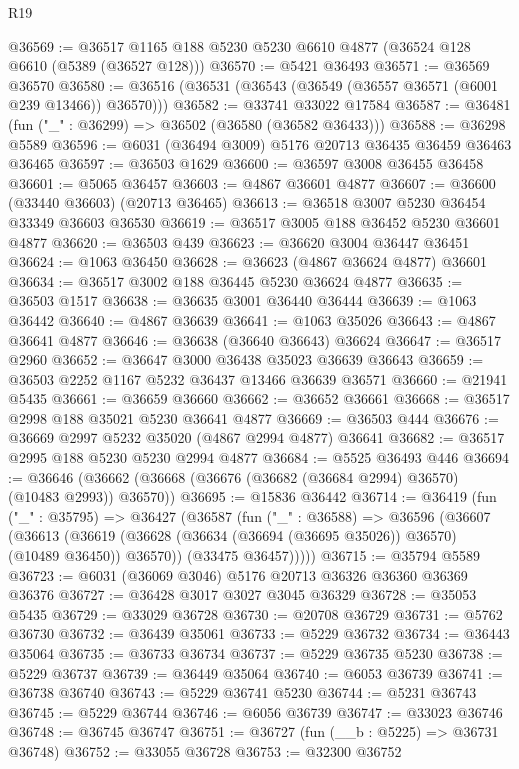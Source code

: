 \begin{lexlean}{R19}
\begin{coremodule}
@36569 := @36517 @1165 @188 @5230 @5230 @6610 @4877 (@36524 @128 @6610 (@5389 (@36527 @128)))
@36570 := @5421 @36493
@36571 := @36569 @36570
@36580 := @36516 (@36531 (@36543 (@36549 (@36557 @36571 (@6001 @239 @13466)) @36570)))
@36582 := @33741 @33022 @17584
@36587 := @36481 (fun ("_" : @36299) => @36502 (@36580 (@36582 @36433)))
@36588 := @36298 @5589
@36596 := @6031 (@36494 @3009) @5176 @20713 @36435 @36459 @36463 @36465
@36597 := @36503 @1629
@36600 := @36597 @3008 @36455 @36458
@36601 := @5065 @36457
@36603 := @4867 @36601 @4877
@36607 := @36600 (@33440 @36603) (@20713 @36465)
@36613 := @36518 @3007 @5230 @36454 @33349 @36603 @36530
@36619 := @36517 @3005 @188 @36452 @5230 @36601 @4877
@36620 := @36503 @439
@36623 := @36620 @3004 @36447 @36451
@36624 := @1063 @36450
@36628 := @36623 (@4867 @36624 @4877) @36601
@36634 := @36517 @3002 @188 @36445 @5230 @36624 @4877
@36635 := @36503 @1517
@36638 := @36635 @3001 @36440 @36444
@36639 := @1063 @36442
@36640 := @4867 @36639
@36641 := @1063 @35026
@36643 := @4867 @36641 @4877
@36646 := @36638 (@36640 @36643) @36624
@36647 := @36517 @2960
@36652 := @36647 @3000 @36438 @35023 @36639 @36643
@36659 := @36503 @2252 @1167 @5232 @36437 @13466 @36639 @36571
@36660 := @21941 @5435
@36661 := @36659 @36660
@36662 := @36652 @36661
@36668 := @36517 @2998 @188 @35021 @5230 @36641 @4877
@36669 := @36503 @444
@36676 := @36669 @2997 @5232 @35020 (@4867 @2994 @4877) @36641
@36682 := @36517 @2995 @188 @5230 @5230 @2994 @4877
@36684 := @5525 @36493 @446
@36694 := @36646 (@36662 (@36668 (@36676 (@36682 (@36684 @2994) @36570) (@10483 @2993)) @36570))
@36695 := @15836 @36442
@36714 := @36419
    (fun ("_" : @35795) =>
    @36427
      (@36587
        (fun ("_" : @36588) =>
        @36596
          (@36607
            (@36613
              (@36619 (@36628 (@36634 (@36694 (@36695 @35026)) @36570) (@10489 @36450)) @36570))
            (@33475 @36457)))))
@36715 := @35794 @5589
@36723 := @6031 (@36069 @3046) @5176 @20713 @36326 @36360 @36369 @36376
@36727 := @36428 @3017 @3027 @3045 @36329
@36728 := @35053 @5435
@36729 := @33029 @36728
@36730 := @20708 @36729
@36731 := @5762 @36730
@36732 := @36439 @35061
@36733 := @5229 @36732
@36734 := @36443 @35064
@36735 := @36733 @36734
@36737 := @5229 @36735 @5230
@36738 := @5229 @36737
@36739 := @36449 @35064
@36740 := @6053 @36739
@36741 := @36738 @36740
@36743 := @5229 @36741 @5230
@36744 := @5231 @36743
@36745 := @5229 @36744
@36746 := @6056 @36739
@36747 := @33023 @36746
@36748 := @36745 @36747
@36751 := @36727 (fun (__b : @5225) => @36731 @36748)
@36752 := @33055 @36728
@36753 := @32300 @36752

\end{coremodule}
\end{lexlean}

